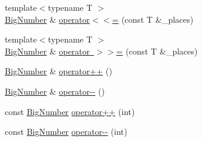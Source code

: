 \begin{DoxyCompactItemize}
\item 
{\footnotesize template$<$typename T $>$ }\\\mbox{\hyperlink{class_big_nums_1_1_big_number}{Big\+Number}} \& \mbox{\hyperlink{class_big_nums_1_1_big_number_a82c0b0b700533df0c96523f5d6fbb2bc}{operator$<$$<$=}} (const T \&\+\_\+places)
\item 
{\footnotesize template$<$typename T $>$ }\\\mbox{\hyperlink{class_big_nums_1_1_big_number}{Big\+Number}} \& \mbox{\hyperlink{class_big_nums_1_1_big_number_a946dfd2531068c7e07946cb4b9af8fa2}{operator $>$$>$=}} (const T \&\+\_\+places)
\item 
\mbox{\hyperlink{class_big_nums_1_1_big_number}{Big\+Number}} \& \mbox{\hyperlink{class_big_nums_1_1_big_number_aac54f4e6e678b26552cef3dbcd18d41f}{operator++}} ()
\item 
\mbox{\hyperlink{class_big_nums_1_1_big_number}{Big\+Number}} \& \mbox{\hyperlink{class_big_nums_1_1_big_number_ada3ed05861f520f73182e42c9fb153cb}{operator-\/-\/}} ()
\item 
const \mbox{\hyperlink{class_big_nums_1_1_big_number}{Big\+Number}} \mbox{\hyperlink{class_big_nums_1_1_big_number_a62c972147e0c20614fa6f2b3831b15b8}{operator++}} (int)
\item 
const \mbox{\hyperlink{class_big_nums_1_1_big_number}{Big\+Number}} \mbox{\hyperlink{class_big_nums_1_1_big_number_ab6475de98159ef5398b22449f5333368}{operator-\/-\/}} (int)
\end{DoxyCompactItemize}
\textbf{ }\par
